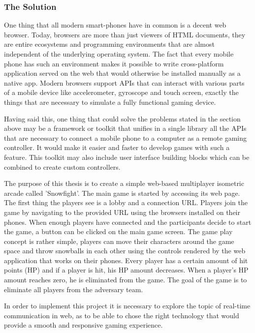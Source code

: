 \subsubsection{The Solution}

One thing that all modern smart-phones have in common is a decent web browser. Today, browsers are more than just viewers of HTML documents, they are entire ecosystems and programming environments that are almost independent of the underlying operating system. The fact that every mobile phone has such an environment makes it possible to write cross-platform application served on the web that would otherwise be installed manually as a native app. Modern browsers support APIs that can interact with various parts of a mobile device like accelerometer, gyroscope and touch screen, exactly the things that are necessary to simulate a fully functional gaming device.

Having said this, one thing that could solve the problems stated in the section above may be a framework or toolkit that unifies in a single library all the APIs that are necessary to connect a mobile phone to a computer as a remote gaming controller. It would make it easier and faster to develop games with such a feature. This toolkit may also include user interface building blocks which can be combined to create custom controllers.

The purpose of this thesis is to create a simple web-based multiplayer isometric arcade called 'Snowfight'. The main game is started by accessing its web page. The first thing the players see is a lobby and a connection URL. Players join the game by navigating to the provided URL using the browsers installed on their phones. When enough players have connected and the participants decide to start the game, a button can be clicked on the main game screen. The game play concept is rather simple, players can move their characters around the game space and throw snowballs in each other using the controls rendered by the web application that works on their phones. Every player has a certain amount of hit points (HP) and if a player is hit, his HP amount decreases. When a player's HP amount reaches zero, he is eliminated from the game. The goal of the game is to eliminate all players from the adversary team.

In order to implement this project it is necessary to explore the topic of real-time communication in web, as to be able to chose the right technology that would provide a smooth and responsive gaming experience.




